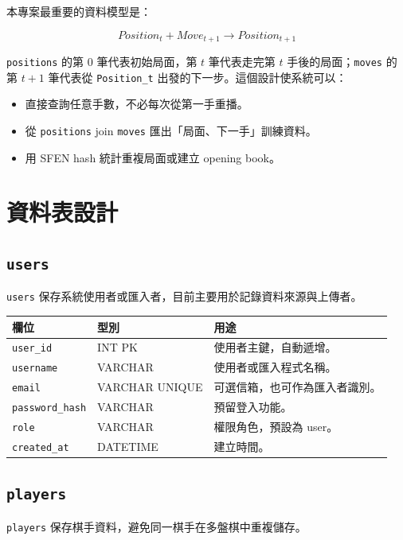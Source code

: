 \documentclass[12pt,a4paper,fontset=none]{ctexart}
\begin{document}
本專案最重要的資料模型是：

\[
Position_t + Move_{t+1} \rightarrow Position_{t+1}
\]

\texttt{positions} 的第 0 筆代表初始局面，第 $t$ 筆代表走完第 $t$ 手後的局面；\texttt{moves} 的第 $t+1$ 筆代表從 \texttt{Position\_t} 出發的下一步。這個設計使系統可以：

\begin{itemize}
  \item 直接查詢任意手數，不必每次從第一手重播。
  \item 從 \texttt{positions} join \texttt{moves} 匯出「局面、下一手」訓練資料。
  \item 用 SFEN hash 統計重複局面或建立 opening book。
\end{itemize}

\section{資料表設計}

\subsection{\texttt{users}}

\texttt{users} 保存系統使用者或匯入者，目前主要用於記錄資料來源與上傳者。

\begin{longtable}{p{}p{}p{}}
\toprule
\textbf{欄位} & \textbf{型別} & \textbf{用途}\\
\midrule
\endhead
\texttt{user\_id} & INT PK & 使用者主鍵，自動遞增。\\
\texttt{username} & VARCHAR & 使用者或匯入程式名稱。\\
\texttt{email} & VARCHAR UNIQUE & 可選信箱，也可作為匯入者識別。\\
\texttt{password\_hash} & VARCHAR & 預留登入功能。\\
\texttt{role} & VARCHAR & 權限角色，預設為 user。\\
\texttt{created\_at} & DATETIME & 建立時間。\\
\bottomrule
\end{longtable}

\subsection{\texttt{players}}

\texttt{players} 保存棋手資料，避免同一棋手在多盤棋中重複儲存。
\end{document}
